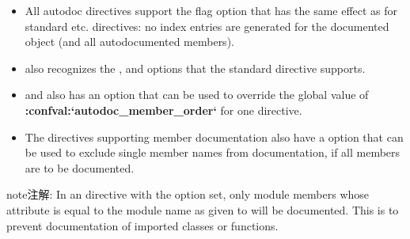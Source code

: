 \documentclass[letterpaper,10pt,english]{sphinxmanual}
\begin{document}
\begin{fulllineitems}
\begin{itemize}

\item {} 
All autodoc directives support the  flag option that has the
same effect as for standard {\hyperref[domains:directive\string-py:function]{}} etc. directives: no
index entries are generated for the documented object (and all
autodocumented members).


\item {} 
{\hyperref[ext/autodoc:directive\string-automodule]{}} also recognizes the ,  and
 options that the standard {\hyperref[domains:directive\string-py:module]{}} directive
supports.


\item {} 
{\hyperref[ext/autodoc:directive\string-automodule]{}} and {\hyperref[ext/autodoc:directive\string-autoclass]{}} also has an 
option that can be used to override the global value of
{\color{red}\bfseries{}:confval:{}`autodoc\_member\_order{}`} for one directive.


\item {} 
The directives supporting member documentation also have a
 option that can be used to exclude single member names
from documentation, if all members are to be documented.


\end{itemize}

\begin{notice}{note}{注解:}
In an {\hyperref[ext/autodoc:directive\string-automodule]{}} directive with the  option set, only
module members whose  attribute is equal to the module name
as given to  will be documented.  This is to prevent
documentation of imported classes or functions.
\end{notice}

\end{fulllineitems}

\end{document}

